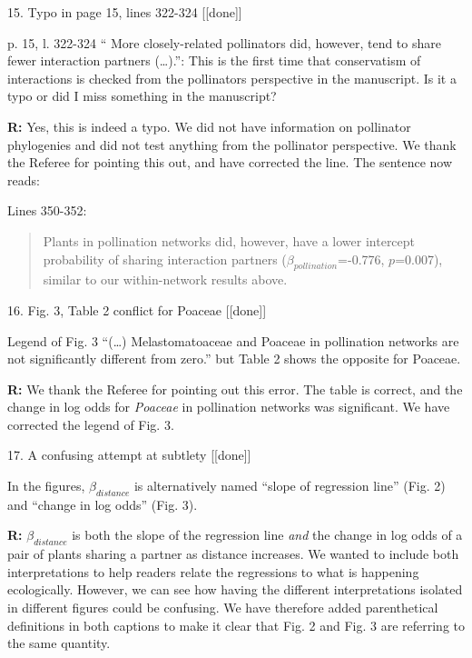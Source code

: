 \documentclass[12pt]{letter}
\newenvironment{refquote}{\bigskip \begin{it}}{\end{it}\smallskip}
\begin{document}
	15. Typo in page 15, lines 322-324 [[done]]

		\begin{refquote}
			p. 15, l. 322-324 “ More closely-related pollinators did, however, tend to share fewer interaction partners (…).”: This is the first time that conservatism of interactions is checked from the pollinators perspective in the manuscript. Is it a typo or did I miss something in the manuscript?
		\end{refquote}


		\textbf{R:} Yes, this is indeed a typo. We did not have information on pollinator phylogenies and did not test anything from the pollinator perspective. We thank the Referee for pointing this out, and have corrected the line. The sentence now reads:

		Lines 350-352:
		
		\begin{quotation}
			Plants in pollination networks did, however, have a lower intercept probability of sharing interaction partners ($\beta_{pollination}$=-0.776, $p$=0.007), similar to our within-network results above.
		\end{quotation}


	16. Fig. 3, Table 2 conflict for Poaceae [[done]]

		\begin{refquote}
			Legend of Fig. 3 “(…) Melastomatoaceae and Poaceae in pollination networks are not significantly different from zero.” but Table 2 shows the opposite for Poaceae.
		\end{refquote}

		\textbf{R:} We thank the Referee for pointing out this error. The table is correct, and the change in log odds for \emph{Poaceae} in pollination networks was significant. We have corrected the legend of Fig. 3.


	17. A confusing attempt at subtlety [[done]]

		\begin{refquote}
			In the figures, $\beta_{distance}$ is alternatively named “slope of regression line” (Fig. 2) and “change in log odds” (Fig. 3).
		\end{refquote}


		\textbf{R:} $\beta_{distance}$ is both the slope of the regression line \emph{and} the change in log odds of a pair of plants sharing a partner as distance increases. We wanted to include both interpretations to help readers relate the regressions to what is happening ecologically. However, we can see how having the different interpretations isolated in different figures could be confusing. We have therefore added parenthetical definitions in both captions to make it clear that Fig. 2 and Fig. 3 are referring to the same quantity.
\end{document}
